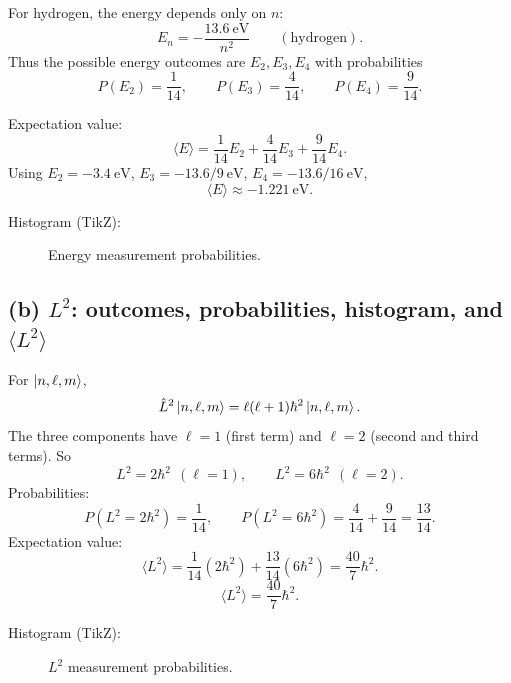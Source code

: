 \documentclass{article}
\begin{document}
For hydrogen, the energy depends only on $n$:
\[
E_n=-\frac{13.6~\text{eV}}{n^2}\qquad (\text{hydrogen}).
\]
Thus the possible energy outcomes are $E_2, E_3, E_4$ with probabilities
\[
P(E_2)=\frac{1}{14},\qquad P(E_3)=\frac{4}{14},\qquad P(E_4)=\frac{9}{14}.
\]

Expectation value:
\[
\langle E\rangle
=\frac{1}{14}E_2+\frac{4}{14}E_3+\frac{9}{14}E_4.
\]
Using $E_2=-3.4~\text{eV}$, $E_3=-13.6/9~\text{eV}$, $E_4=-13.6/16~\text{eV}$,
\[
\boxed{\langle E\rangle \approx -1.221~\text{eV}.}
\]

Histogram (TikZ):
\begin{figure}[H]
\centering
{}
\caption{Energy measurement probabilities.}
\end{figure}

\subsection*{(b) $L^2$: outcomes, probabilities, histogram, and $\langle L^2\rangle$}

For $\ket{n,\ell,m}$,
\[
\hat L^2\ket{n,\ell,m}=\ell(\ell+1)\hbar^2\ket{n,\ell,m}.
\]
The three components have $\ell=1$ (first term) and $\ell=2$ (second and third terms). So
\[
L^2 = 2\hbar^2 \ \ (\ell=1),\qquad
L^2 = 6\hbar^2 \ \ (\ell=2).
\]
Probabilities:
\[
P(L^2=2\hbar^2)=\frac{1}{14},\qquad
P(L^2=6\hbar^2)=\frac{4}{14}+\frac{9}{14}=\frac{13}{14}.
\]
Expectation value:
\[
\langle L^2\rangle
=\frac{1}{14}(2\hbar^2)+\frac{13}{14}(6\hbar^2)
=\frac{40}{7}\hbar^2.
\]
\[
\boxed{\langle L^2\rangle=\frac{40}{7}\hbar^2.}
\]

Histogram (TikZ):
\begin{figure}[H]
\centering
{}
\caption{$L^2$ measurement probabilities.}
\end{figure}
\end{document}
